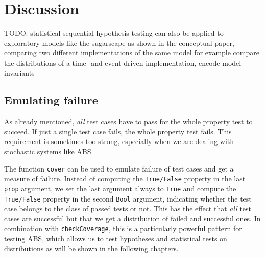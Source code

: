 \section{Discussion}
\label{sec:discussion}

TODO: statistical sequential hypothesis testing can also be applied to exploratory models like the sugarscape as shown in the conceptual paper, comparing two different implementations of the same model for example compare the distributions of a time- and event-driven implementation, encode model invariants 

\subsection{Emulating failure}
As already mentioned, \textit{all} test cases have to pass for the whole property test to succeed. If just a single test case fails, the whole property test fails. This requirement is sometimes too strong, especially when we are dealing with stochastic systems like ABS.

The function \texttt{cover} can be used to emulate failure of test cases and get a measure of failure. Instead of computing the \texttt{True/False} property in the last \texttt{prop} argument, we set the last argument always to \texttt{True} and compute the \texttt{True/False} property in the second \texttt{Bool} argument, indicating whether the test case belongs to the class of passed tests or not. This has the effect that \textit{all} test cases are successful but that we get a distribution of failed and successful ones. In combination with \texttt{checkCoverage}, this is a particularly powerful pattern for testing ABS, which allows us to test hypotheses and statistical tests on distributions as will be shown in the following chapters.